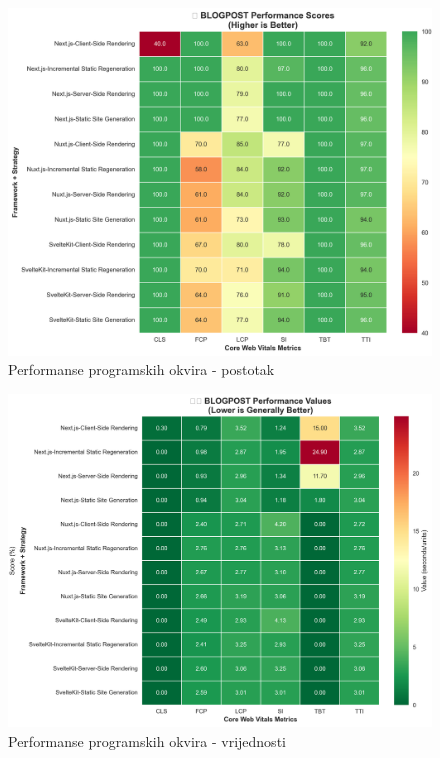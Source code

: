 \begin{figure}[H]
    \centering
    \includegraphics[width=\textwidth]{slike/rezultati/blog-post/blogPost_performance_scores.png}
    \caption{Performanse programskih okvira - postotak}
    \label{fig:testiranje-blog-post-postotak}
\end{figure}

\begin{figure}[H]
    \centering
    \includegraphics[width=\textwidth]{slike/rezultati/blog-post/blogPost_performance_values.png}
    \caption{Performanse programskih okvira - vrijednosti}
    \label{fig:testiranje-blog-post-vrijednosti}
\end{figure}

